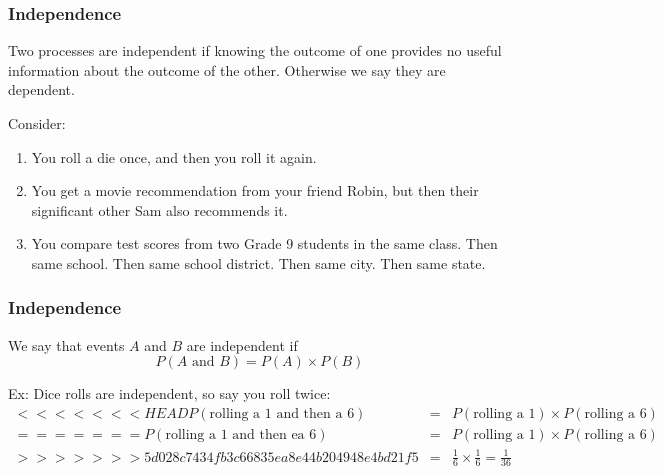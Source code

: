 \documentclass[slides]{beamer}
\newcommand{\blue}[1]{\textcolor{blue2}{#1}}
\begin{document}
\begin{frame}
\frametitle{Independence}
Two processes are \blue{independent} if knowing the outcome of one provides no useful information about the outcome of the other.  Otherwise we say they are dependent.

\vspace{0.5cm}

\pause Consider:
\begin{enumerate}
\pause \item You roll a die once, and then you roll it again.
\pause \item You get a movie recommendation from your friend Robin, but then their significant other Sam also recommends it.  
\pause \item You compare test scores from two Grade 9 students in the same class.  Then same school.  Then same school district.  Then same city.  Then same state.
\end{enumerate}

\end{frame}


\begin{frame}
\frametitle{Independence}
We say that events $A$ and $B$ are \blue{independent} if
\[
P(A \mbox{ and } B) = P(A) \times P(B)
\]

\vspace{0.5cm}

\pause Ex: Dice rolls are independent, so say you roll twice:
\begin{eqnarray*}
<<<<<<< HEAD
P(\mbox{rolling a 1 and then a 6}) &=& P(\mbox{rolling a 1}) \times P(\mbox{rolling a 6})\\
=======
P(\mbox{rolling a 1 and then ea 6}) &=& P(\mbox{rolling a 1}) \times P(\mbox{rolling a 6})\\
>>>>>>> 5d028c7434fb3c66835ea8e44b204948e4bd21f5
&=& \frac{1}{6}\times\frac{1}{6} = \frac{1}{36}
\end{eqnarray*}

\end{frame}
\end{document}
